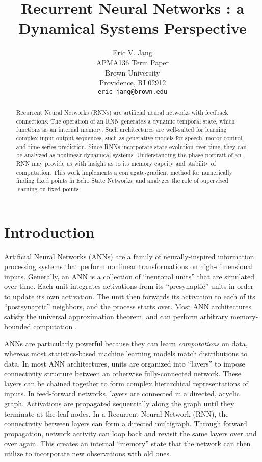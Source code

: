 \documentclass{article} %
\title{Recurrent Neural Networks : a Dynamical Systems Perspective}
\author{
Eric V. Jang \\
APMA136 Term Paper \\
Brown University \\
Providence, RI 02912 \\
\texttt{eric\_jang@brown.edu} \\
}
\begin{document}
\maketitle

\begin{abstract}
Recurrent Neural Networks (RNNs) are artificial neural networks with feedback connections. The operation of an RNN generates a dynamic temporal state, which functions as an internal memory. Such architectures are well-suited for learning complex input-output sequences, such as generative models for speech, motor control, and time series prediction. Since RNNs incorporate state evolution over time, they can be analyzed as nonlinear dynamical systems. Understanding the phase portrait of an RNN may provide us with insight as to its memory capcity and stability of computation. This work implements a conjugate-gradient method for numerically finding fixed points in Echo State Networks, and analyzes the role of supervised learning on fixed points.
\end{abstract}

\section{Introduction} %

Artificial Neural Networks (ANNs) are a family of neurally-inspired information processing systems that perform nonlinear transformations on high-dimensional inputs. Generally, an ANN is a collection of ``neuronal units'' that are simulated over time. Each unit integrates activations from its ``presynaptic'' units in order to update its own activation. The unit then forwards its activation to each of its ``postsynaptic'' neighbors, and the process starts over. Most ANN architectures satisfy the universal approximation theorem, and can perform arbitrary memory-bounded computation \cite{Hornik1991251}.

ANNs are particularly powerful because they can learn \textit{computations} on data, whereas most statistics-based machine learning models match distributions to data. In most ANN architectures, units are organized into ``layers'' to impose connectivity structure between an otherwise fully-connected network. These layers can be chained together to form complex hierarchical representations of inputs. In feed-forward networks, layers are connected in a directed, acyclic graph. Activations are propagated sequentially along the graph until they terminate at the leaf nodes. In a Recurrent Neural Network (RNN), the connectivity between layers can form a directed multigraph. Through forward propagation, network activity can loop back and revisit the same layers over and over again. This creates an internal ``memory'' state that the network can then utilize to incorporate new observations with old ones.
\end{document}

